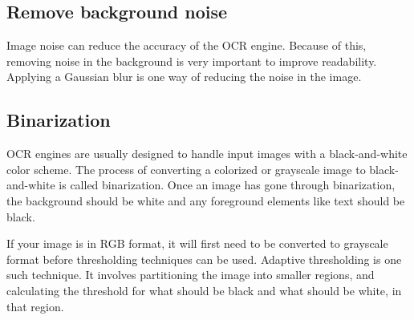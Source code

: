 \subsection{Remove background noise}\label{subsec:remove-background-noise}
Image noise can reduce the accuracy of the OCR engine.
Because of this, removing noise in the background is very important to improve readability.
Applying a Gaussian blur is one way of reducing the noise in the image.

\subsection{Binarization}\label{subsec:how-to-create-contrast}
OCR engines are usually designed to handle input images with a black-and-white color scheme.
The process of converting a colorized or grayscale image to black-and-white is called binarization.
Once an image has gone through binarization, the background should be white and any foreground elements like text should be black.

If your image is in RGB format, it will first need to be converted to grayscale format before thresholding techniques can be used.
Adaptive thresholding is one such technique.
It involves partitioning the image into smaller regions, and calculating the threshold for what should be black and what should be white, in that region.



